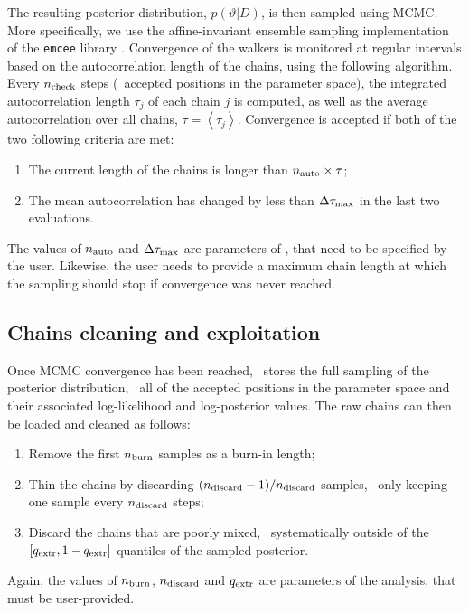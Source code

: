 The resulting posterior distribution, $p(\vartheta | D)$, is then sampled using MCMC.
More specifically, we use the affine-invariant ensemble sampling implementation of the \texttt{emcee} library \cite{foreman-mackey_emcee_2019}.
Convergence of the walkers is monitored at regular intervals based on the autocorrelation length of the chains, using the following algorithm.
Every $n_{\rm check}$ steps (\ie\ accepted positions in the parameter space), the integrated autocorrelation length $\tau_j$ of each chain $j$ is computed, as well as the average autocorrelation over all chains, $\tau = \left< \tau_j \right>$.
Convergence is accepted if both of the two following criteria are met:
\begin{enumerate}[leftmargin=*]
    \item The current length of the chains is longer than $n_{\rm auto} \times \tau$;
    \item The mean autocorrelation has changed by less than $\Delta\tau_{\rm max}$ in the last two evaluations.
\end{enumerate}
The values of $n_{\rm auto}$ and $\Delta\tau_{\rm max}$ are parameters of \panco, that need to be specified by the user.
Likewise, the user needs to provide a maximum chain length at which the sampling should stop if convergence was never reached.

\subsection{Chains cleaning and exploitation} \label{sec:algo:outputs}

Once MCMC convergence has been reached, \panco\ stores the full sampling of the posterior distribution, \ie\ all of the accepted positions in the parameter space and their associated log-likelihood and log-posterior values.
The raw chains can then be loaded and cleaned as follows:
\begin{enumerate}[leftmargin=*]
    \item Remove the first $n_{\rm burn}$ samples as a burn-in length;
    \item Thin the chains by discarding $(n_{\rm discard} - 1) / n_{\rm discard}$ samples, \ie\ only keeping one sample every $n_{\rm discard}$ steps;
    \item Discard the chains that are poorly mixed, \ie\ systematically outside of the $[q_{\rm extr}, 1 - q_{\rm extr}]$ quantiles of the sampled posterior.
\end{enumerate}
Again, the values of $n_{\rm burn}$, $n_{\rm discard}$ and $q_{\rm extr}$ are parameters of the analysis, that must be user-provided.

